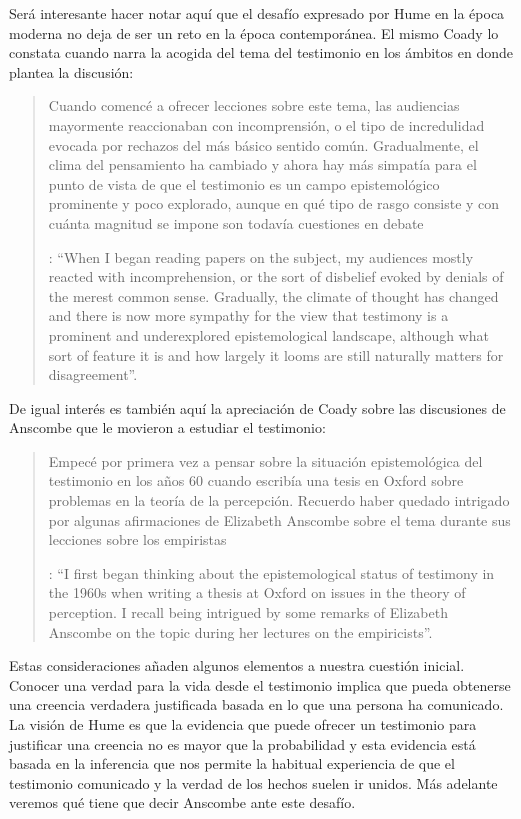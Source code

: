 Será interesante hacer notar aquí que el desafío expresado por Hume en la época moderna no deja de ser un reto en la época contemporánea. El mismo Coady lo constata cuando narra la acogida del tema del testimonio en los ámbitos en donde plantea la discusión: \blockquote[{\Cite[vii]{coady1992test}}: \enquote{When I began reading papers on the subject, my audiences mostly reacted with incomprehension, or the sort of disbelief evoked by denials of the merest common sense. Gradually, the climate of thought has changed and there is now more sympathy for the view that testimony is a prominent and underexplored epistemological landscape, although what sort of feature it is and how largely it looms are still naturally matters for disagreement}.]{Cuando comencé a ofrecer lecciones sobre este tema, las audiencias mayormente reaccionaban con incomprensión, o el tipo de incredulidad evocada por rechazos del más básico sentido común. Gradualmente, el clima del pensamiento ha cambiado y ahora hay más simpatía para el punto de vista de que el testimonio es un campo epistemológico prominente y poco explorado, aunque en qué tipo de rasgo consiste y con cuánta magnitud se impone son todavía cuestiones en debate}. De igual interés es también aquí la apreciación de Coady sobre las discusiones de Anscombe que le movieron a estudiar el testimonio: \blockquote[{\Cite[vii]{coady1992test}}: \enquote{I first began thinking about the epistemological status of testimony in the 1960s when writing a thesis at Oxford on issues in the theory of perception. \textelp{} I recall being intrigued by some remarks of Elizabeth Anscombe on the topic during her lectures on the empiricists}.]{Empecé por primera vez a pensar sobre la situación epistemológica del testimonio en los años 60 cuando escribía una tesis en Oxford sobre problemas en la teoría de la percepción. \textelp{} Recuerdo haber quedado intrigado por algunas afirmaciones de Elizabeth Anscombe sobre el tema durante sus lecciones sobre los empiristas}

Estas consideraciones añaden algunos elementos a nuestra cuestión inicial. Conocer una verdad para la vida desde el testimonio implica que pueda obtenerse una creencia verdadera justificada basada en lo que una persona ha comunicado. La visión de Hume es que la evidencia que puede ofrecer un testimonio para justificar una creencia no es mayor que la probabilidad y esta evidencia está basada en la inferencia que nos permite la habitual experiencia de que el testimonio comunicado y la verdad de los hechos suelen ir unidos. Más adelante veremos qué tiene que decir Anscombe ante este desafío.

